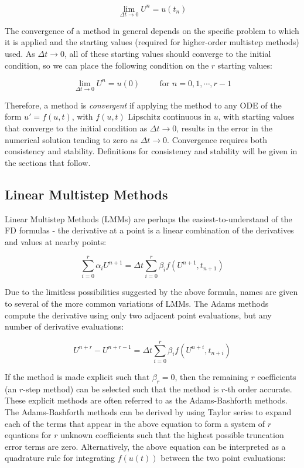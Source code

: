 \documentclass[10pt]{article}
\newcommand{\beq}{\begin{equation}}
\newcommand{\eeq}{\end{equation}}
\begin{document}
\begin{flushleft}
\beq
\lim_{\Delta t\rightarrow0}U^n=u(t_n)
\eeq

The convergence of a method in general depends on the specific problem to which it is applied and the starting values (required for higher-order multistep methods) used. As \(\Delta t\rightarrow0\), all of these starting values should converge to the initial condition, so we can place the following condition on the \(r\) starting values:

\beq
\lim_{\Delta t\rightarrow0}U^n=u(0)\hspace{1cm} \text{for\ } n=0, 1, \cdots, r-1
\eeq

Therefore, a method is {\it convergent} if applying the method to any ODE of the form \(u'=f(u,t)\), with \(f(u,t)\) Lipschitz continuous in \(u\), with starting values that converge to the initial condition as \(\Delta t\rightarrow0\), results in the error in the numerical solution tending to zero as \(\Delta t\rightarrow0\). Convergence requires both consistency and stability. Definitions for consistency and stability will be given in the sections that follow.

\subsection{Linear Multistep Methods}
Linear Multistep Methods (LMMs) are perhaps the easiest-to-understand of the FD formulas - the derivative at a point is a linear combination of the derivatives and values at nearby points:

\beq
\label{eq:LMM}
\sum_{i=0}^{r}\alpha_iU^{n+1}=\Delta t\sum_{i=0}^{r}\beta_if(U^{n+1},t_{n+1})
\eeq

\begin{tcolorbox}[breakable]
Due to the limitless possibilities suggested by the above formula, names are given to several of the more common variations of LMMs. The Adams methods compute the derivative using only two adjacent point evaluations, but any number of derivative evaluations:

\beq
U^{n+r}-U^{n+r-1}=\Delta t\sum_{i=0}^{r}\beta_if(U^{n+i},t_{n+i})
\eeq

If the method is made explicit such that \(\beta_r=0\), then the remaining \(r\) coefficients (an \(r\)-step method) can be selected such that the method is \(r\)-th order accurate. These explicit methods are often referred to as the Adams-Bashforth methods. The Adams-Bashforth methods can be derived by using Taylor series to expand each of the terms that appear in the above equation to form a system of \(r\) equations for \(r\) unknown coefficients such that the highest possible truncation error terms are zero. Alternatively, the above equation can be interpreted as a quadrature rule for integrating \(f(u(t))\) between the two point evaluations:


\end{tcolorbox}
\end{flushleft}
\end{document}
